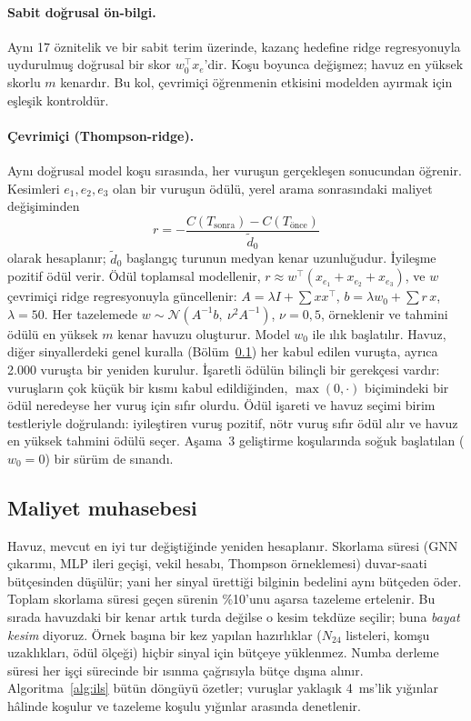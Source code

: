 \documentclass[pdflatex,sn-basic]{sn-jnl}
\begin{document}
\paragraph{Sabit doğrusal ön-bilgi.} Aynı 17 öznitelik ve bir sabit terim üzerinde, kazanç hedefine
ridge regresyonuyla uydurulmuş doğrusal bir skor $w_0^\top x_e$'dir. Koşu boyunca değişmez; havuz en
yüksek skorlu $m$ kenardır. Bu kol, çevrimiçi öğrenmenin etkisini modelden ayırmak için eşleşik
kontroldür.

\paragraph{Çevrimiçi (Thompson-ridge).} Aynı doğrusal model koşu sırasında, her vuruşun gerçekleşen
sonucundan öğrenir. Kesimleri $e_1,e_2,e_3$ olan bir vuruşun ödülü, yerel arama sonrasındaki
maliyet değişiminden
\begin{equation}
  r=-\frac{C(T_{\text{sonra}})-C(T_{\text{önce}})}{\tilde d_0}
  \label{eq:reward}
\end{equation}
olarak hesaplanır; $\tilde d_0$ başlangıç turunun medyan kenar uzunluğudur. İyileşme pozitif ödül
verir. Ödül toplamsal modellenir, $r\approx w^\top(x_{e_1}+x_{e_2}+x_{e_3})$, ve $w$ çevrimiçi
ridge regresyonuyla güncellenir: $A=\lambda I+\sum xx^\top$, $b=\lambda w_0+\sum r\,x$,
$\lambda=50$. Her tazelemede $w\sim\mathcal N(A^{-1}b,\ \nu^2A^{-1})$, $\nu=0{,}5$, örneklenir ve
tahmini ödülü en yüksek $m$ kenar havuzu oluşturur. Model $w_0$ ile ılık başlatılır. Havuz, diğer sinyallerdeki genel kuralla
(Bölüm~\ref{sec:yontem-maliyet}) her kabul edilen vuruşta, ayrıca 2.000 vuruşta bir yeniden kurulur. İşaretli ödülün bilinçli bir gerekçesi
vardır: vuruşların çok küçük bir kısmı kabul edildiğinden, $\max(0,\cdot)$ biçimindeki bir ödül
neredeyse her vuruş için sıfır olurdu. Ödül işareti ve havuz seçimi birim testleriyle doğrulandı:
iyileştiren vuruş pozitif, nötr vuruş sıfır ödül alır ve havuz en yüksek tahmini ödülü seçer.
Aşama~3 geliştirme koşularında soğuk başlatılan ($w_0=0$) bir sürüm de sınandı.

\subsection{Maliyet muhasebesi}\label{sec:yontem-maliyet}

Havuz, mevcut en iyi tur değiştiğinde yeniden hesaplanır. Skorlama süresi (GNN çıkarımı, MLP ileri
geçişi, vekil hesabı, Thompson örneklemesi) duvar-saati bütçesinden düşülür; yani her sinyal
ürettiği bilginin bedelini aynı bütçeden öder. Toplam skorlama süresi geçen sürenin \%10'unu
aşarsa tazeleme ertelenir. Bu sırada havuzdaki bir kenar artık turda değilse o kesim tekdüze
seçilir; buna \emph{bayat kesim} diyoruz. Örnek başına bir kez yapılan hazırlıklar ($N_{24}$
listeleri, komşu uzaklıkları, ödül ölçeği) hiçbir sinyal için bütçeye yüklenmez. Numba derleme
süresi her işçi sürecinde bir ısınma çağrısıyla bütçe dışına alınır. Algoritma~\ref{alg:ils}
bütün döngüyü özetler; vuruşlar yaklaşık 4~ms'lik yığınlar hâlinde koşulur ve tazeleme koşulu
yığınlar arasında denetlenir.
\end{document}
